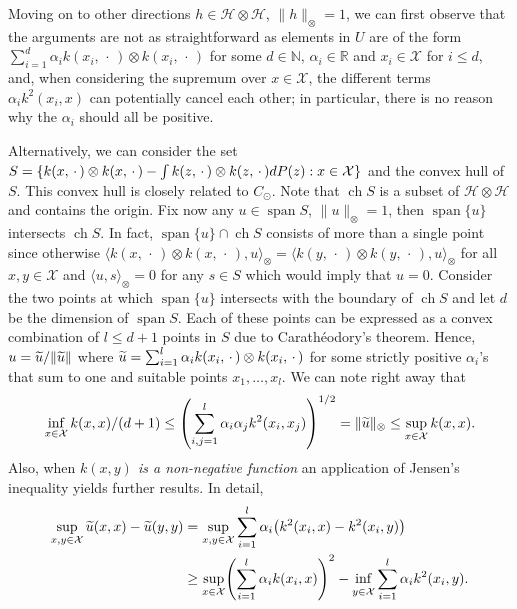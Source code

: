 \documentclass[AHL,Unicode,longabstracts,published]{cedram}
\theoremstyle{remark}
\DeclareMathOperator*{\infd}{inf\vphantom{p}}
\DeclareMathOperator{\ch}{ch}
\DeclareMathOperator{\spn}{span}
\newcommand{\R}{\mathbb{R}}
\newcommand{\bbN}{\mathbb{N}}
\newcommand{\X}{\mathcal{X}}
\newcommand{\cH}{\mathcal{H}}
\let\oldtilde\tilde
\renewcommand*{\tilde}[1]{\mathchoice{\widetilde{#1}}{\widetilde{#1}}{\oldtilde{#1}}{\oldtilde{#1}}}
\let\originalleft\left
\let\originalright\right
\renewcommand{\left}{\mathopen{}\mathclose\bgroup\originalleft}
\renewcommand{\right}{\aftergroup\egroup\originalright}
\begin{document}
Moving on to other directions $h \in \cH \otimes \cH$, $\|h\|_\otimes = 1$, we can first observe that the arguments are not as straightforward as elements in $U$ are of the form $\sum_{i=1}^d \alpha_i k(x_i,\,\cdot\,) \otimes k(x_i,\,\cdot\,)$ for some $d\in \bbN$, $\alpha_i \in \R$ and $x_i \in \X$ for $i\leq d$, and, when considering the supremum over $x \in \X$, the different terms $\alpha_i k^2(x_i,x)$ can potentially cancel each other; in particular, there is no reason why the $\alpha_i$ should all be positive.



Alternatively, we can consider the set $S= \{k(x,\,\cdot\,) \otimes k(x,\,\cdot\,) - \int k(z,\,\cdot\,) \otimes k(z,\,\cdot\,)\linebreak dP(z) : x \in \X\}$ and the convex hull of $S$. This convex hull is closely related to $C_\odot$. Note that $\ch S$ is a subset of $\cH \otimes \cH$ and contains the origin. Fix now any $u\in \spn S$, $\|u\|_\otimes = 1$, then $\spn \{u\}$ intersects $\ch S$. In fact, $\spn \{u\} \cap \ch S$ consists of more than a single point since otherwise $\langle k(x,\,\cdot\,) \otimes k(x,\,\cdot\,), u \rangle_\otimes = \langle k(y,\,\cdot\,) \otimes k(y,\,\cdot\,), u \rangle_\otimes $ for all $x,y \in \X$ and $\langle u, s \rangle_\otimes =0$ for any $s \in S$ which would imply that $u = 0$. Consider the two points at which $\spn \{u\}$ intersects with the boundary of $\ch S$ and let $d$ be the dimension of $\spn S$. Each of these points can be expressed as a convex combination of $ l\leq d+1$ points in $S$ due to Carathéodory's theorem. Hence, $u = \tilde u/\|\tilde u\|$ where $\tilde u = \sum_{i=1}^{l} \alpha_i k(x_i,\,\cdot\,) \otimes k(x_i,\,\cdot\,)$ for some strictly positive $\alpha_i$'s that sum to one and suitable points $x_1,\dots, x_{l}$. We can note right away that
\begin{equation}\label{eq:bnds_on_u}
\inf_{x\in \X} k(x,x) /(d+1) \leq \left(\sum_{i,j=1}^{l} \alpha_i \alpha_j k^2(x_i,x_j) \right)^{1/2} =
\|\tilde u \|_\otimes \leq \sup_{x\in \X} k(x,x).
\end{equation}
Also, when \emph{$k(x,y)$ is a non-negative function} an application of Jensen's inequality yields further results. In detail,
\begin{align*}
\sup_{x,y \in \X} \tilde u(x,x) - \tilde u(y,y) &= \sup_{x,y \in \X} \sum_{i=1}^{l} \alpha_i \left(k^2(x_i,x) - k^2(x_i,y)\right) \\
&\geq \sup_{x \in \X} \left( \sum_{i=1}^{l} \alpha_i k(x_i,x) \right)^2 - \infd_{y \in \X} \sum_{i=1}^{l} \alpha_i k^2(x_i,y).
\end{align*}
\end{document}
